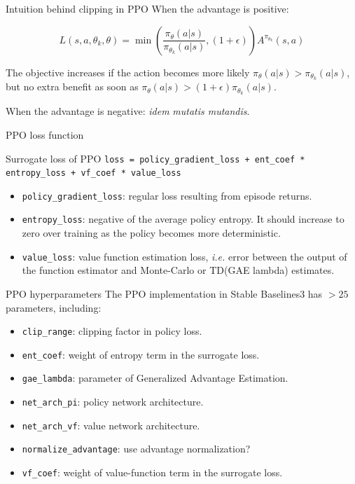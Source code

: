 \documentclass[10pt, aspectratio=1610]{beamer}
\begin{document}
\begin{frame}{Intuition behind clipping in PPO}
    When the advantage is positive:

    $$L(s,a,\theta_k,\theta) = \min\left( \frac{\pi_{\theta}(a|s)}{\pi_{\theta_k}(a|s)}, (1 + \epsilon) \right) A^{\pi_{\theta_k}}(s,a)$$

    The objective increases if the action becomes more likely $\pi_{\theta}(a|s) > \pi_{\theta_k}(a|s)$, but no extra benefit as soon as $ \pi_{\theta}(a|s) > (1+\epsilon) \pi_{\theta_k}(a|s)$.

    When the advantage is negative: \emph{idem} \emph{mutatis mutandis}.
\end{frame}

\begin{frame}[fragile]{PPO loss function}
    \begin{block}{Surrogate loss of PPO}
        \texttt{loss = policy_gradient_loss + ent_coef * entropy_loss + vf_coef * value_loss}
    \end{block}
    \begin{itemize}
        \item \texttt{policy_gradient_loss}: regular loss resulting from episode returns.
        \item \texttt{entropy_loss}: negative of the average policy entropy. It should increase to zero over training as the policy becomes more deterministic.
        \item \texttt{value_loss}: value function estimation loss, \emph{i.e.} error between the output of the function estimator and Monte-Carlo or TD(GAE lambda) estimates.
    \end{itemize}
\end{frame}

\begin{frame}{PPO hyperparameters}
    The PPO implementation in Stable Baselines3 has $> 25$ parameters, including:
    \begin{itemize}
        \item \texttt{clip_range}: clipping factor in policy loss.
        \item \texttt{ent_coef}: weight of entropy term in the surrogate loss.
        \item \texttt{gae_lambda}: parameter of Generalized Advantage Estimation.
        \item \texttt{net_arch_pi}: policy network architecture.
        \item \texttt{net_arch_vf}: value network architecture.
        \item \texttt{normalize_advantage}: use advantage normalization?
        \item \texttt{vf_coef}: weight of value-function term in the surrogate loss.
    \end{itemize}
\end{frame}
\end{document}
